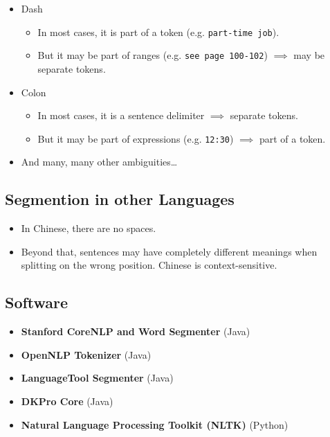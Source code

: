 \begin{itemize}
                	\item Dash
                		\begin{itemize}
                			\item In most cases, it is part of a token (e.g. \texttt{part-time job}).
                			\item But it may be part of ranges (e.g. \texttt{see page 100-102}) \(\implies\) may be separate tokens.
                		\end{itemize}
                	\item Colon
                		\begin{itemize}
                			\item In most cases, it is a sentence delimiter \(\implies\) separate tokens.
                			\item But it may be part of expressions (e.g. \texttt{12:30}) \(\implies\) part of a token.
                		\end{itemize}
                	\item And many, many other ambiguities\dots
                \end{itemize}

        \subsection{Segmention in other Languages} %
        	\begin{itemize}
        		\item In Chinese, there are no spaces.
        		\item Beyond that, sentences may have completely different meanings when splitting on the wrong position. Chinese is context-sensitive.
        	\end{itemize}

        \subsection{Software} %
            \begin{itemize}
            	\item \textbf{Stanford CoreNLP and Word Segmenter} (Java)
            	\item \textbf{OpenNLP Tokenizer} (Java)
            	\item \textbf{LanguageTool Segmenter} (Java)
            	\item \textbf{DKPro Core} (Java)
            	\item \textbf{Natural Language Processing Toolkit (NLTK)} (Python)
            \end{itemize}

